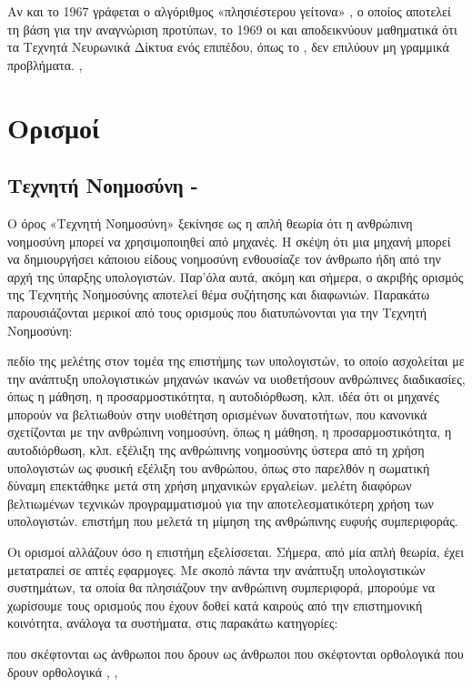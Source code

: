Αν και το 1967 γράφεται ο αλγόριθμος «πλησιέστερου γείτονα» , ο οποίος αποτελεί τη βάση για την αναγνώριση προτύπων, το 1969 οι  και  αποδεικνύουν μαθηματικά ότι τα Τεχνητά Νευρωνικά Δίκτυα ενός επιπέδου, όπως το , δεν επιλύουν μη γραμμικά προβλήματα. \cite{3.2}, \cite{3.3}

\section{Ορισμοί}
\subsection{Τεχνητή Νοημοσύνη - }

Ο όρος «Τεχνητή Νοημοσύνη» ξεκίνησε ως η απλή θεωρία ότι η ανθρώπινη νοημοσύνη μπορεί να χρησιμοποιηθεί από μηχανές. Η σκέψη ότι μια μηχανή μπορεί να δημιουργήσει κάποιου είδους νοημοσύνη ενθουσίαζε τον άνθρωπο ήδη από την αρχή της ύπαρξης υπολογιστών. Παρ’όλα αυτά, ακόμη και σήμερα, ο ακριβής ορισμός της Τεχνητής Νοημοσύνης αποτελεί θέμα συζήτησης και διαφωνιών. Παρακάτω παρουσιάζονται μερικοί από τους ορισμούς που διατυπώνονται για την Τεχνητή Νοημοσύνη:
\begin{itemize}
	 πεδίο της μελέτης στον τομέα της επιστήμης των υπολογιστών, το οποίο ασχολείται με την ανάπτυξη υπολογιστικών μηχανών ικανών να υιοθετήσουν ανθρώπινες διαδικασίες, όπως η μάθηση, η προσαρμοστικότητα, η αυτοδιόρθωση, κλπ.
	 ιδέα ότι οι μηχανές μπορούν να βελτιωθούν στην υιοθέτηση ορισμένων δυνατοτήτων, που κανονικά σχετίζονται με την ανθρώπινη νοημοσύνη, όπως η μάθηση, η προσαρμοστικότητα, η αυτοδιόρθωση, κλπ.
	 εξέλιξη της ανθρώπινης νοημοσύνης ύστερα από τη χρήση υπολογιστών ως φυσική εξέλιξη του ανθρώπου, όπως στο παρελθόν η σωματική δύναμη επεκτάθηκε μετά στη χρήση μηχανικών εργαλείων.
     μελέτη διαφόρων βελτιωμένων τεχνικών προγραμματισμού για την αποτελεσματικότερη χρήση των υπολογιστών.
     επιστήμη που μελετά τη μίμηση της ανθρώπινης ευφυής συμπεριφοράς.
\end{itemize}
Οι ορισμοί αλλάζουν όσο η επιστήμη εξελίσσεται. Σήμερα, από μία απλή θεωρία, έχει μετατραπεί σε απτές εφαρμογες. Με σκοπό πάντα την ανάπτυξη υπολογιστικών συστημάτων, τα οποία θα πλησιάζουν την ανθρώπινη συμπεριφορά, μπορούμε να χωρίσουμε τους ορισμούς που έχουν δοθεί κατά καιρούς από την επιστημονική κοινότητα, ανάλογα τα συστήματα, στις παρακάτω κατηγορίες:
\begin{itemize}
	 που σκέφτονται ως άνθρωποι
	 που δρουν ως άνθρωποι
	 που σκέφτονται ορθολογικά
	 που δρουν ορθολογικά \cite{3.8}, \cite{3.9}, \cite{3.10} 
\end{itemize}

